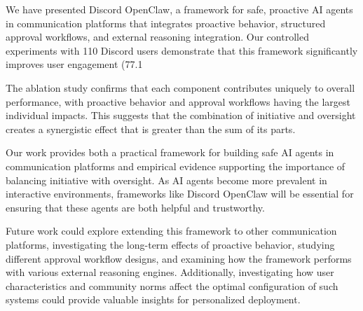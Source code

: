 We have presented Discord OpenClaw, a framework for safe, proactive AI agents in communication platforms that integrates proactive behavior, structured approval workflows, and external reasoning integration. Our controlled experiments with 110 Discord users demonstrate that this framework significantly improves user engagement (77.1%

The ablation study confirms that each component contributes uniquely to overall performance, with proactive behavior and approval workflows having the largest individual impacts. This suggests that the combination of initiative and oversight creates a synergistic effect that is greater than the sum of its parts.

Our work provides both a practical framework for building safe AI agents in communication platforms and empirical evidence supporting the importance of balancing initiative with oversight. As AI agents become more prevalent in interactive environments, frameworks like Discord OpenClaw will be essential for ensuring that these agents are both helpful and trustworthy.

Future work could explore extending this framework to other communication platforms, investigating the long-term effects of proactive behavior, studying different approval workflow designs, and examining how the framework performs with various external reasoning engines. Additionally, investigating how user characteristics and community norms affect the optimal configuration of such systems could provide valuable insights for personalized deployment.